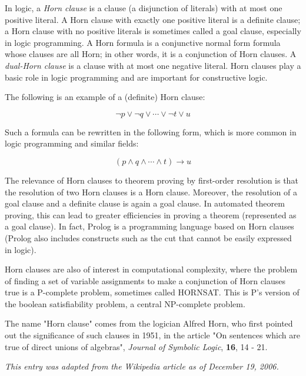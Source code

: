 \documentclass[12pt]{article}
\begin{document}
In logic, a {\em Horn clause} is a clause (a disjunction of literals) with at most one positive literal. A Horn clause with exactly one positive literal is a definite clause; a Horn clause with no positive literals is sometimes called a goal clause, especially in logic programming. A Horn formula is a conjunctive normal form formula whose clauses are all Horn; in other words, it is a conjunction of Horn clauses. A {\em dual-Horn clause} is a clause with at most one negative literal. Horn clauses play a basic role in logic programming and are important for constructive logic.

The following is an example of a (definite) Horn clause:

$$\neg p \vee \neg q \vee \cdots \vee \neg t \vee u$$

Such a formula can be rewritten in the following form, which is more common in logic programming and similar fields:

$$(p \wedge q \wedge \cdots \wedge t) \rightarrow u$$

The relevance of Horn clauses to theorem proving by first-order resolution is that the resolution of two Horn clauses is a Horn clause. Moreover, the resolution of a goal clause and a definite clause is again a goal clause. In automated theorem proving, this can lead to greater efficiencies in proving a theorem (represented as a goal clause). In fact, Prolog is a programming language based on Horn clauses (Prolog also includes constructs such as the cut that cannot be easily expressed in logic).

Horn clauses are also of interest in computational complexity, where the problem of finding a set of variable assignments to make a conjunction of Horn clauses true is a P-complete problem, sometimes called HORNSAT. This is P's version of the boolean satisfiability problem, a central NP-complete problem.

The name "Horn clause" comes from the logician Alfred Horn, who first pointed out the significance of such clauses in 1951, in the article "On sentences which are true of direct unions of algebras", {\it Journal of Symbolic Logic}, {\bf 16}, 14 - 21.

{\it This entry was adapted from the Wikipedia article  as of December 19, 2006.}
\end{document}
